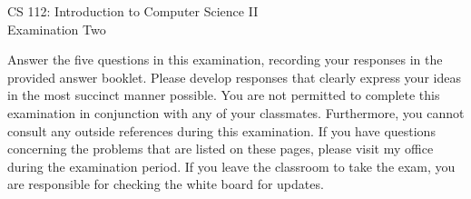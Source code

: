 \documentclass[12pt]{article}
\def\widow#1{\vskip #1\vbadness10000\penalty-200\vskip-#1}
\begin{document}
\def\widow#1{\vskip #1\vbadness10000\penalty-200\vskip-#1}

\begin{center}

  CS 112: Introduction to Computer Science II \\
  Examination Two \\

\end{center}

\noindent Answer the five questions in this examination, recording your responses in the provided answer booklet.
Please develop responses that clearly express your ideas in the most succinct manner possible.  You are not permitted to
complete this examination in conjunction with any of your classmates.  Furthermore, you cannot consult any outside
references during this examination.  If you have questions concerning the problems that are listed on these pages,
please visit my office during the examination period.  If you leave the classroom to take the exam, you are responsible
for checking the white board for updates.
\end{document}
